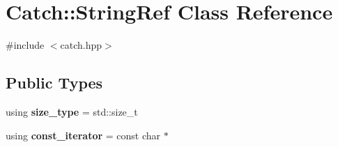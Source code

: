\hypertarget{classCatch_1_1StringRef}{}\section{Catch\+:\+:String\+Ref Class Reference}
\label{classCatch_1_1StringRef}


{\ttfamily \#include $<$catch.\+hpp$>$}

\subsection*{Public Types}
\begin{DoxyCompactItemize}
\item 
\mbox{\label{classCatch_1_1StringRef_a06b4db8fc82b197004291cf370b2ba7c}} 
using {\bfseries size\+\_\+type} = std\+::size\+\_\+t
\item 
\mbox{\label{classCatch_1_1StringRef_ac3aa3d16f48b5429a480f823c504f93c}} 
using {\bfseries const\+\_\+iterator} = const char $\ast$
\end{DoxyCompactItemize}
